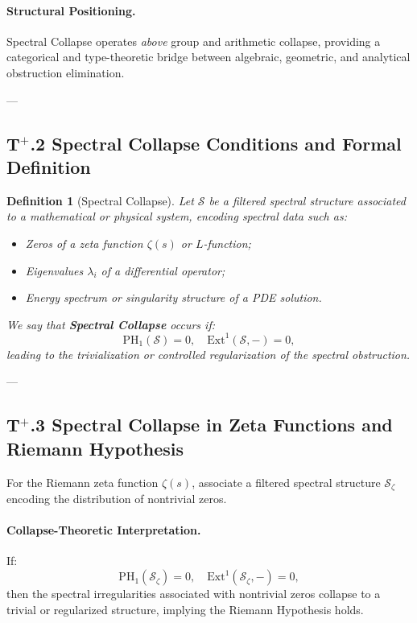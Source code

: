 \documentclass[11pt]{article}
\newtheorem{definition}[theorem]{Definition}
\begin{document}
\paragraph{Structural Positioning.} Spectral Collapse operates \emph{above} group and arithmetic collapse, providing a categorical and type-theoretic bridge between algebraic, geometric, and analytical obstruction elimination.

---

\subsection*{T$^{+}$.2 Spectral Collapse Conditions and Formal Definition}

\begin{definition}[Spectral Collapse]
Let $\mathcal{S}$ be a filtered spectral structure associated to a mathematical or physical system, encoding spectral data such as:
\begin{itemize}
    \item Zeros of a zeta function $\zeta(s)$ or $L$-function;
    \item Eigenvalues $\lambda_i$ of a differential operator;
    \item Energy spectrum or singularity structure of a PDE solution.
\end{itemize}

We say that \textbf{Spectral Collapse} occurs if:
\[
\mathrm{PH}_1(\mathcal{S}) = 0, \quad \mathrm{Ext}^1(\mathcal{S}, -) = 0,
\]
leading to the trivialization or controlled regularization of the spectral obstruction.
\end{definition}

---

\subsection*{T$^{+}$.3 Spectral Collapse in Zeta Functions and Riemann Hypothesis}

For the Riemann zeta function $\zeta(s)$, associate a filtered spectral structure $\mathcal{S}_{\zeta}$ encoding the distribution of nontrivial zeros.

\paragraph{Collapse-Theoretic Interpretation.}
If:
\[
\mathrm{PH}_1(\mathcal{S}_{\zeta}) = 0, \quad \mathrm{Ext}^1(\mathcal{S}_{\zeta}, -) = 0,
\]
then the spectral irregularities associated with nontrivial zeros collapse to a trivial or regularized structure, implying the Riemann Hypothesis holds.
\end{document}
